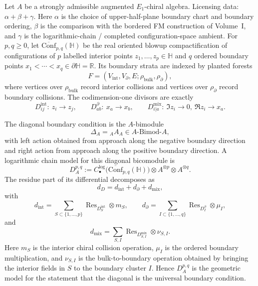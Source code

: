 \begin{theorem}
\label{thm:bordered-diagonal-bicomodule-chain-model}
Let \(A\) be a strongly admissible augmented \(E_1\)-chiral algebra.
Licensing data: \(\alpha+\beta+\gamma\).  Here \(\alpha\) is the
choice of upper-half-plane boundary chart and boundary ordering,
\(\beta\) is the comparison with the bordered FM construction of
Volume~I, and \(\gamma\) is the logarithmic-chain / completed
configuration-space ambient.
For \(p,q\geq 0\), let
\(\overline{\mathrm{Conf}}_{p,q}(\mathbb H)\) be the real oriented
blowup compactification of configurations of \(p\) labelled interior
points \(z_1,\ldots,z_p\in\mathbb H\) and \(q\) ordered boundary
points \(x_1<\cdots <x_q\in\partial\mathbb H=\mathbb R\). Its
boundary strata are indexed by planted forests
\[
F=(V_{\mathrm{int}},V_{\partial},E;\rho_{\mathrm{bulk}},\rho_{\partial}),
\]
where vertices over \(\rho_{\mathrm{bulk}}\) record interior
collisions and vertices over \(\rho_{\partial}\) record boundary
collisions. The codimension-one divisors are exactly
\[
D_{ij}^{\mathrm{int}}:\ z_i\to z_j,\qquad
D_{ab}^{\partial}:\ x_a\to x_b,\qquad
D_{i|a}^{\mathrm{mix}}:\ \Im z_i\to0,\ \Re z_i\to x_a.
\]

The diagonal boundary condition is the \(A\)-bimodule
\[
\Delta_A={}_AA_A\in A\text{-}\mathrm{Bimod}\text{-}A,
\]
with left action obtained from approach along the negative boundary
direction and right action from approach along the positive boundary
direction. A logarithmic chain model for this diagonal bicomodule is
\begin{equation}\label{eq:bordered-diagonal-chain}
D_A^{p,q}
:=
C_\bullet^{\log}\!\bigl(\overline{\mathrm{Conf}}_{p,q}(\mathbb H)\bigr)
\otimes A^{\otimes p}\otimes A^{\otimes q}.
\end{equation}
The residue part of its differential decomposes as
\begin{equation}\label{eq:bordered-diagonal-differential}
d_D=d_{\mathrm{int}}+d_{\partial}+d_{\mathrm{mix}},
\end{equation}
with
\[
d_{\mathrm{int}}
=
\sum_{S\subset\{1,\ldots,p\}}
\operatorname{Res}_{D_S^{\mathrm{int}}}\otimes m_S,\qquad
d_{\partial}
=
\sum_{I\subset\{1,\ldots,q\}}
\operatorname{Res}_{D_I^{\partial}}\otimes\mu_I,
\]
and
\[
d_{\mathrm{mix}}
=
\sum_{S,I}
\operatorname{Res}_{D_{S,I}^{\mathrm{mix}}}\otimes\nu_{S,I}.
\]
Here \(m_S\) is the interior chiral collision operation, \(\mu_I\) is
the ordered boundary multiplication, and \(\nu_{S,I}\) is the
bulk-to-boundary operation obtained by bringing the interior fields in
\(S\) to the boundary cluster \(I\). Hence \(D_A^{p,q}\) is the
geometric model for the statement that the diagonal is the universal
boundary condition.


\end{theorem}
